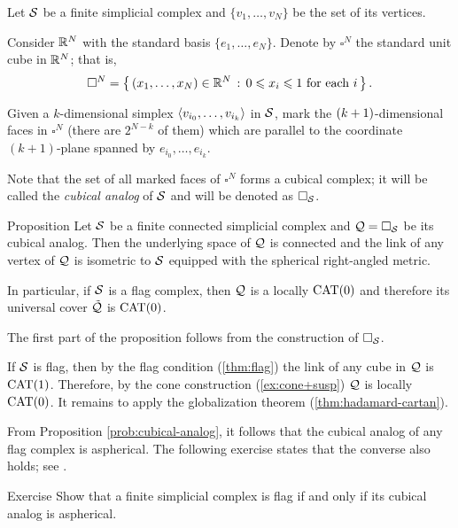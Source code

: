 Let $\mathcal{S}$ be a finite simplicial complex and $\{v_1,\dots,v_N\}$ be the set of its vertices.

Consider $\mathbb{R}^N$ with the standard basis $\{e_1,\dots,e_N\}$.
Denote by $\square^N$ the standard unit cube in $\mathbb{R}^N$;
that is, 
\[\square^N=\left\{\,{(x_1,\dots,x_N)\in \mathbb{R}^N}\,:\,{0\leqslant x_i\leqslant 1\ \text{for each}\ i}\,\right\}.\]

Given a $k$-dimensional simplex $\langle v_{i_0},\dots,v_{i_k}\rangle$ in $\mathcal{S}$, 
mark the $(k\z+1)$-dimensional faces in $\square^N$ (there are  $2^{N-k}$ of them)
which are parallel to the coordinate $(k+1)$-plane 
spanned by $e_{i_0},\dots,e_{i_k}$.


Note that the set of all marked faces of $\square^{N}$
forms a cubical complex;
it will be called 
the \emph{cubical analog} of $\mathcal{S}$
and will be denoted as $\square_{\mathcal{S}}$.

\begin{thm}{Proposition}\label{prob:cubical-analog}
Let $\mathcal{S}$ be a finite connected simplicial complex
and $\mathcal{Q}=\square_{\mathcal{S}}$ be its cubical analog.
Then the underlying space of $\mathcal{Q}$ is connected 
and the link of any vertex of $\mathcal{Q}$
is isometric to  ${\mathcal{S}}$
equipped with the spherical right-angled metric.

In particular, if $\mathcal{S}$ is a flag complex,
then $\mathcal{Q}$ is a locally $\mathrm{CAT}(0)$
and therefore its universal cover $\tilde{\mathcal{Q}}$ is $\mathrm{CAT}(0)$.
\end{thm}

The first part of the proposition follows 
from the construction of $\square_{\mathcal{S}}$.

If ${\mathcal{S}}$ is flag, 
then by the flag condition (\ref{thm:flag}) 
the link of any cube in $\mathcal{Q}$ is $\mathrm{CAT}(1)$.
Therefore, by the cone construction (\ref{ex:cone+susp})
$\mathcal{Q}$
is locally $\mathrm{CAT}(0)$.
It remains to apply the globalization theorem 
(\ref{thm:hadamard-cartan}).
\qeds

From Proposition \ref{prob:cubical-analog}, 
it follows that the cubical analog
of any flag complex is aspherical.
The following exercise states that the  converse also holds; see \cite[5.4]{davis-2001}.

\begin{thm}{Exercise}\label{ex:flag-aspherical}
Show that a finite simplicial complex is flag 
if and only if its cubical analog is aspherical.
\end{thm}

